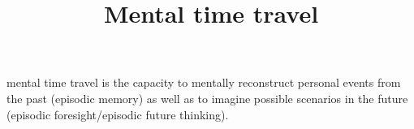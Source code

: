 \documentclass[a4paper]{article}
\title{Mental time travel}
\date{}
\begin{document}
\maketitle
     mental time travel is the capacity to mentally reconstruct personal events from the past (episodic memory) as well as to imagine possible scenarios in the future (episodic foresight/episodic future thinking). 
\end{document}
